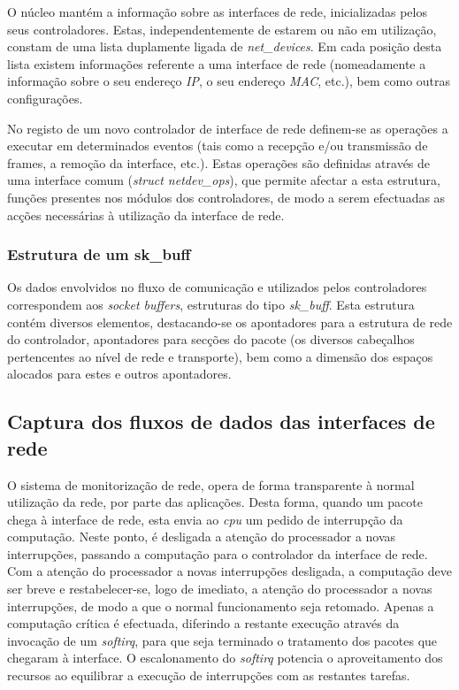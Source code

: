 O núcleo mantém a informação sobre as interfaces de rede, inicializadas pelos seus controladores.
Estas, independentemente de estarem ou não em utilização, constam de uma lista duplamente ligada de \textit{net\_devices}.
Em cada posição desta lista existem informações referente a uma interface de rede (nomeadamente a informação sobre o seu endereço \textit{IP}, o seu endereço \textit{MAC}, etc.), bem como outras configurações.

No registo de um novo controlador de interface de rede definem-se as operações a executar em determinados eventos (tais como a recepção e/ou transmissão de frames, a remoção da interface, etc.).
Estas operações são definidas através de uma interface comum (\textit{struct netdev\_ops}), que permite afectar a esta estrutura, funções presentes nos módulos dos controladores, de modo a serem efectuadas as acções necessárias à utilização da interface de rede.

\subsubsection{Estrutura de um sk\_buff}
\label{subsub:sk_buff}

Os dados envolvidos no fluxo de comunicação e utilizados pelos controladores correspondem aos \textit{socket buffers}, estruturas do tipo \textit{sk\_buff}.
Esta estrutura contém diversos elementos, destacando-se os apontadores para a estrutura de rede do controlador, apontadores para secções do pacote (os diversos cabeçalhos pertencentes ao nível de rede e transporte), bem como a dimensão dos espaços alocados para estes e outros apontadores.

\subsection{Captura dos fluxos de dados das interfaces de rede}
\label{sub:network_cap}
O sistema de monitorização de rede, opera de forma transparente à normal utilização da rede, por parte das aplicações.
Desta forma, quando um pacote chega à interface de rede, esta envia ao \textit{cpu} um pedido de interrupção da computação.
Neste ponto, é desligada a atenção do processador a novas interrupções, passando a computação para o controlador da interface de rede.
Com a atenção do processador a novas interrupções desligada, a computação deve ser breve e restabelecer-se, logo de imediato, a atenção do processador a novas interrupções, de modo a que o normal funcionamento seja retomado.
Apenas a computação crítica é efectuada, diferindo a restante execução através da invocação de um \textit{softirq}, para que seja terminado o tratamento dos pacotes que chegaram à interface.
O escalonamento do \textit{softirq} potencia o aproveitamento dos recursos ao equilibrar a execução de interrupções com as restantes tarefas.

